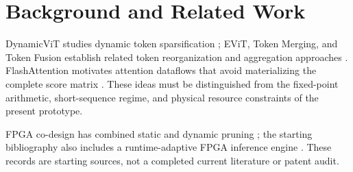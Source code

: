 \section{Background and Related Work}
\label{sec:related-work}
DynamicViT studies dynamic token sparsification \cite{arxiv210602034}; EViT,
Token Merging, and Token Fusion establish related token reorganization and
aggregation approaches \cite{arxiv220207800,arxiv221009461,arxiv231201026}.
FlashAttention motivates attention dataflows that avoid materializing the
complete score matrix \cite{arxiv220514135}. These ideas must be distinguished
from the fixed-point arithmetic, short-sequence regime, and physical resource
constraints of the present prototype.

FPGA co-design has combined static and dynamic pruning
\cite{arxiv240314047}; the starting bibliography also includes a runtime-adaptive
FPGA inference engine \cite{arxiv260322867}. These records are starting sources,
not a completed current literature or patent audit.
